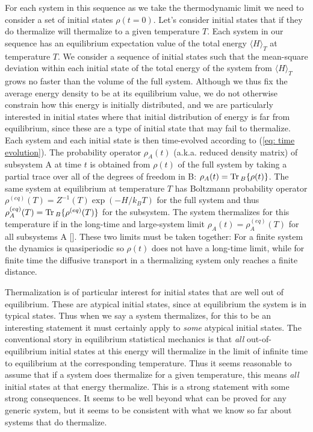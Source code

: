 \documentclass[amsmath,onecolumn, superscriptaddress,preprint,aps]{revtex4}
\newcommand{\Tr}{{\rm Tr}\,}
\renewcommand{\cite}[1]{[\onlinecite{#1}]}
\begin{document}
For each system in this sequence as we take the thermodynamic limit we need to consider a set of initial states $\rho(t=0)$.  Let's consider initial states that
if they do thermalize will thermalize to a given temperature $T$.  Each system in our sequence has an equilibrium expectation value of the total energy
$\langle H\rangle_T$ at temperature $T$.  We consider a sequence of initial states such that the mean-square deviation within each initial state of the total energy of the system from
$\langle H\rangle_T$ grows no faster than the volume of the full system.  Although we thus fix the average energy density to be at its equilibrium value,
we do not otherwise constrain how this energy is initially distributed, and we are particularly interested in initial states where that initial distribution of
energy is far from equilibrium, since these are a type of initial state that may fail to thermalize.
Each system and each initial state is then time-evolved according to (\ref{eq: time evolution}).  The probability operator $\rho_A(t)$ (a.k.a. reduced density matrix) of subsystem A at time $t$ is obtained from $\rho(t)$ of the full system by taking a partial trace over all of the degrees of freedom in B: $\rho_A(t) = \Tr_B\{\rho(t)\}$.  The same system at equilibrium at temperature $T$ has Boltzmann probability operator $\rho^{(eq)}(T)=Z^{-1}(T)\exp{(-H/k_BT)}$ for the full system and thus $\rho_A^{(eq)}(T) = \Tr_B\{\rho^{(eq)}(T)\}$ for the subsystem.  The system thermalizes for this temperature if in the long-time and large-system limit $\rho_A(t)=\rho_A^{(eq)}(T)$ for all subsystems A \cite{Deutsch, Srednicki,tasaki, Rigol}.  These two limits must be taken together:  For a finite system the dynamics is quasiperiodic so $\rho(t)$ does not have a long-time limit, while for finite time the diffusive transport in a thermalizing system only reaches a finite distance.

Thermalization is of particular interest for initial states that are well out of equilibrium.  These are atypical initial states, since at equilibrium the system is in typical states.  Thus when we say a system thermalizes, for this to be an interesting statement it must certainly apply to {\it some} atypical initial states.  The conventional story in equilibrium statistical mechanics is that {\it all} out-of-equilibrium initial states at this energy will thermalize in the limit of infinite time to equilibrium at the corresponding temperature.  Thus it seems reasonable to assume that if a system does thermalize for a given temperature, this means {\it all} initial states at that energy thermalize.  This is a strong statement with some strong consequences.  It seems to be well beyond what can be proved for any generic system, but it seems to be consistent with what we know so far about systems that do thermalize.
\end{document}
